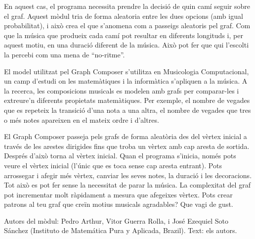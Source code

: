 En aquest cas, el programa necessita prendre la decisió de quin camí seguir sobre el graf. Aquest mòdul tria de forma aleatoria entre les dues opcions (amb igual probabilitat), i això crea el que s'anomena com a passeigs aleatoris pel graf. Com que la música que produeix cada camí pot resultar en diferents longituds i, per aquest motiu, en una duració diferent de la música. Això pot fer que qui l'escolti la percebi com una mena de ``no-ritme''.

El model utilitzat pel Graph Composer s'utilitza en Musicologia Computacional, un camp d'estudi on les matemàtiques i la informàtica s'apliquen a la música. A la recerca, les composicions musicals es modelen amb grafs per comparar-les i extreure'n diferents propietats matemàtiques. Per exemple, el nombre de vegades que es repeteix la transició d'una nota a una altra, el nombre de vegades que tres o més notes apareixen en el mateix ordre i d'altres.

El Graph Composer passeja pels grafs de forma aleatòria des del vèrtex inicial a través de les arestes dirigides fins que troba un vèrtex amb cap aresta de sortida. Després d'això torna al vèrtex inicial. Quan el programa s'inicia, només pots veure el vèrtex inicial (l'únic que es toca sense cap aresta entrant). Pots arrossegar i afegir més vèrtex, canviar les seves notes, la duració i les decoracions. Tot això es pot fer sense la necessitat de parar la música. La complexitat del graf pot incrementar molt ràpidament a mesura que afegeixes vèrtex. Pots crear patrons al teu graf que creïn motius musicals agradables? Que vagi de gust.


\vfill

Autors del mòdul: Pedro Arthur, Vitor Guerra Rolla, i José Ezequiel Soto Sánchez (Instituto de Matemática Pura y Aplicada, Brazil).
Text: els autors.
